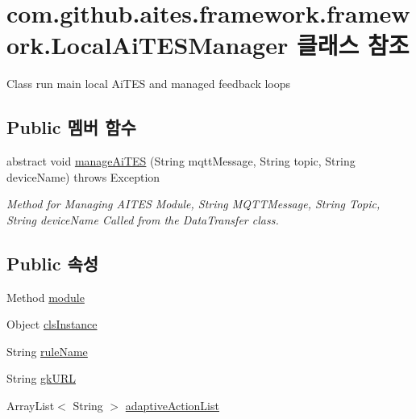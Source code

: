 \hypertarget{classcom_1_1github_1_1aites_1_1framework_1_1framework_1_1_local_ai_t_e_s_manager}{}\section{com.\+github.\+aites.\+framework.\+framework.\+Local\+Ai\+T\+E\+S\+Manager 클래스 참조}
\label{classcom_1_1github_1_1aites_1_1framework_1_1framework_1_1_local_ai_t_e_s_manager}


Class run main local Ai\+T\+ES and managed feedback loops  


\subsection*{Public 멤버 함수}
\begin{DoxyCompactItemize}
\item 
abstract void \mbox{\hyperlink{classcom_1_1github_1_1aites_1_1framework_1_1framework_1_1_local_ai_t_e_s_manager_a2bc882848bd635b1a807bb1441df999b}{manage\+Ai\+T\+ES}} (String mqtt\+Message, String topic, String device\+Name)  throws Exception
\begin{DoxyCompactList}\small\item\em Method for Managing A\+I\+T\+ES Module, String M\+Q\+T\+T\+Message, String Topic, String device\+Name Called from the Data\+Transfer class. \end{DoxyCompactList}\end{DoxyCompactItemize}
\subsection*{Public 속성}
\begin{DoxyCompactItemize}
\item 
Method \mbox{\hyperlink{classcom_1_1github_1_1aites_1_1framework_1_1framework_1_1_local_ai_t_e_s_manager_a90f88498d6d48bfe43e6a5d6c0eff3a4}{module}}
\item 
Object \mbox{\hyperlink{classcom_1_1github_1_1aites_1_1framework_1_1framework_1_1_local_ai_t_e_s_manager_ab8984b4b213b234e0e055c289cc842c5}{cls\+Instance}}
\item 
String \mbox{\hyperlink{classcom_1_1github_1_1aites_1_1framework_1_1framework_1_1_local_ai_t_e_s_manager_a0b3260e3179b31185fce93254a9039c8}{rule\+Name}}
\item 
String \mbox{\hyperlink{classcom_1_1github_1_1aites_1_1framework_1_1framework_1_1_local_ai_t_e_s_manager_a63f2cc45a25395cea15a5840d9a0fbad}{gk\+U\+RL}}
\item 
Array\+List$<$ String $>$ \mbox{\hyperlink{classcom_1_1github_1_1aites_1_1framework_1_1framework_1_1_local_ai_t_e_s_manager_a150010229fa99dbac302843f2801b963}{adaptive\+Action\+List}}
\end{DoxyCompactItemize}
